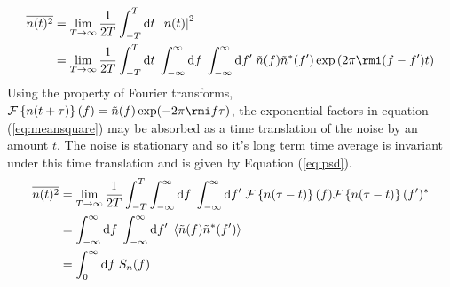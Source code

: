 \begin{eqnarray}\label{eq:meansquare}
\overline{n(t)^{2}}&=\lim_{T\rightarrow\infty}\frac{1}{2T}\int_{-T}^{T}\mathrm{d}t\;\left| n(t) \right|^{2} \nonumber \\
&=\lim_{T\rightarrow\infty}\frac{1}{2T}\int_{-T}^{T}\mathrm{d}t\; \int_{-\infty}^{\infty}\mathrm{d}f\;\int_{-\infty}^{\infty}\mathrm{d}f'\;\tilde{n}(f)\tilde{n}^{*}(f')\exp\left(2\pi \rmi (f-f')t \right)
\end{eqnarray}
Using the property of Fourier transforms, ${\cal{F}}\left\{ n(t+\tau) \right\}(f)=\tilde{n}(f)\exp (-2\pi \rmi f\tau )$, the exponential factors in equation (\ref{eq:meansquare}) may be absorbed as a time translation of the noise by an amount $t$. The noise is stationary and so it's long term time average is invariant under this time translation and is given by Equation (\ref{eq:psd}).
\begin{eqnarray}\label{eq:meansquare1}
\overline{n(t)^{2}}& = \lim_{T\rightarrow\infty}\frac{1}{2T}\int_{-T}^{T}\int_{-\infty}^{\infty}\mathrm{d}f\;\int_{-\infty}^{\infty}\mathrm{d}f'\;{\cal{F}}\left\{ n(\tau-t) \right\}(f){\cal{F}}\left\{ n(\tau-t) \right\}(f')^{*} \nonumber \\
&=\int_{-\infty}^{\infty}\mathrm{d}f\;\int_{-\infty}^{\infty}\mathrm{d}f'\;\left<\tilde{n}(f)\tilde{n}^{*}(f')\right>\nonumber \\
& = \int_{0}^{\infty}\mathrm{d}f\; S_{n}(f)
\end{eqnarray}





